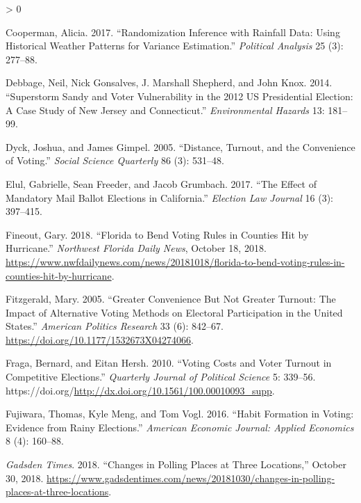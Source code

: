 \documentclass[
  12pt,
]{article}
\newlength{\cslhangindent}
\newenvironment{CSLReferences}[2] %
 {%
  \setlength{\parindent}{0pt}
  \ifodd #1 \everypar{\setlength{\hangindent}{\cslhangindent}}\ignorespaces\fi
  \ifnum #2 > 0
  \setlength{\parskip}{#2\baselineskip}
  \fi
 }%
 {}
\begin{document}
\begin{CSLReferences}{1}{0}
\leavevmode\hypertarget{ref-Cooperman2017}{}%
Cooperman, Alicia. 2017. {``Randomization {Inference} with {Rainfall Data}: {Using Historical Weather Patterns} for {Variance Estimation}.''} \emph{Political Analysis} 25 (3): 277--88.

\leavevmode\hypertarget{ref-Debbage2014}{}%
Debbage, Neil, Nick Gonsalves, J. Marshall Shepherd, and John Knox. 2014. {``Superstorm {Sandy} and {Voter Vulnerability} in the 2012 {US Presidential Election}: {A Case Study} of {New Jersey} and {Connecticut}.''} \emph{Environmental Hazards} 13: 181--99.

\leavevmode\hypertarget{ref-Dyck2005}{}%
Dyck, Joshua, and James Gimpel. 2005. {``Distance, {Turnout}, and the {Convenience} of {Voting}.''} \emph{Social Science Quarterly} 86 (3): 531--48.

\leavevmode\hypertarget{ref-Elul2017}{}%
Elul, Gabrielle, Sean Freeder, and Jacob Grumbach. 2017. {``The {Effect} of {Mandatory Mail Ballot Elections} in {California}.''} \emph{Election Law Journal} 16 (3): 397--415.

\leavevmode\hypertarget{ref-Fineout2018}{}%
Fineout, Gary. 2018. {``Florida to Bend Voting Rules in Counties Hit by Hurricane.''} \emph{Northwest Florida Daily News}, October 18, 2018. \url{https://www.nwfdailynews.com/news/20181018/florida-to-bend-voting-rules-in-counties-hit-by-hurricane}.

\leavevmode\hypertarget{ref-Fitzgerald2005}{}%
Fitzgerald, Mary. 2005. {``Greater {Convenience But Not Greater Turnout}: {The Impact} of {Alternative Voting Methods} on {Electoral Participation} in the {United States}.''} \emph{American Politics Research} 33 (6): 842--67. \url{https://doi.org/10.1177/1532673X04274066}.

\leavevmode\hypertarget{ref-Fraga2010}{}%
Fraga, Bernard, and Eitan Hersh. 2010. {``Voting {Costs} and {Voter Turnout} in {Competitive Elections}.''} \emph{Quarterly Journal of Political Science} 5: 339--56. https://doi.org/\url{http://dx.doi.org/10.1561/100.00010093_supp}.

\leavevmode\hypertarget{ref-Fujiwara2016}{}%
Fujiwara, Thomas, Kyle Meng, and Tom Vogl. 2016. {``Habit {Formation} in {Voting}: {Evidence} from {Rainy Elections}.''} \emph{American Economic Journal: Applied Economics} 8 (4): 160--88.

\leavevmode\hypertarget{ref-gadsdentimes2018}{}%
\emph{Gadsden Times}. 2018. {``Changes in Polling Places at Three Locations,''} October 30, 2018. \url{https://www.gadsdentimes.com/news/20181030/changes-in-polling-places-at-three-locations}.


\end{CSLReferences}
\end{document}
